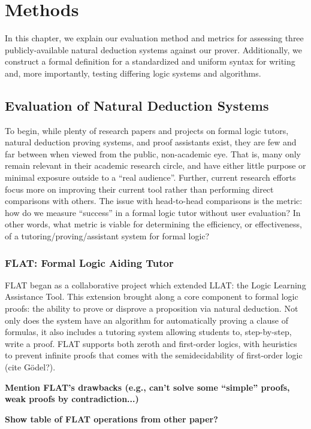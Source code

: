 \documentclass[ms]{uncgdissertationexp2}
\theoremstyle{plain}
\theoremstyle{definition}
\theoremstyle{remark}
\begin{document}
\chapter{Methods}
    In this chapter, we explain our evaluation method and metrics for assessing three publicly-available natural deduction systems against our prover. Additionally, we construct a formal definition for a standardized and uniform syntax for writing and, more importantly, testing differing logic systems and algorithms.
    \section{Evaluation of Natural Deduction Systems}
    To begin, while plenty of research papers and projects on formal logic tutors, natural deduction proving systems, and proof assistants exist, they are few and far between when viewed from the public, non-academic eye. That is, many only remain relevant in their academic research circle, and have either little purpose or minimal exposure outside to a ``real audience''. Further, current research efforts focus more on improving their current tool rather than performing direct comparisons with others. The issue with head-to-head comparisons is the metric: how do we measure ``success'' in a formal logic tutor without user evaluation? In other words, what metric is viable for determining the efficiency, or effectiveness, of a tutoring/proving/assistant system for formal logic?

    \subsection{FLAT: Formal Logic Aiding Tutor}
    FLAT began as a collaborative project which extended LLAT: the Logic Learning Assistance Tool. This extension brought along a core component to formal logic proofs: the ability to prove or disprove a proposition via natural deduction. Not only does the system have an algorithm for automatically proving a clause of formulas, it also includes a tutoring system allowing students to, step-by-step, write a proof. FLAT supports both zeroth and first-order logics, with heuristics to prevent infinite proofs that comes with the semidecidability of first-order logic (cite G\"odel?).

    \textbf{Mention FLAT's drawbacks (e.g., can't solve some ``simple'' proofs, weak proofs by contradiction...)}

    \textbf{Show table of FLAT operations from other paper?}
\end{document}
